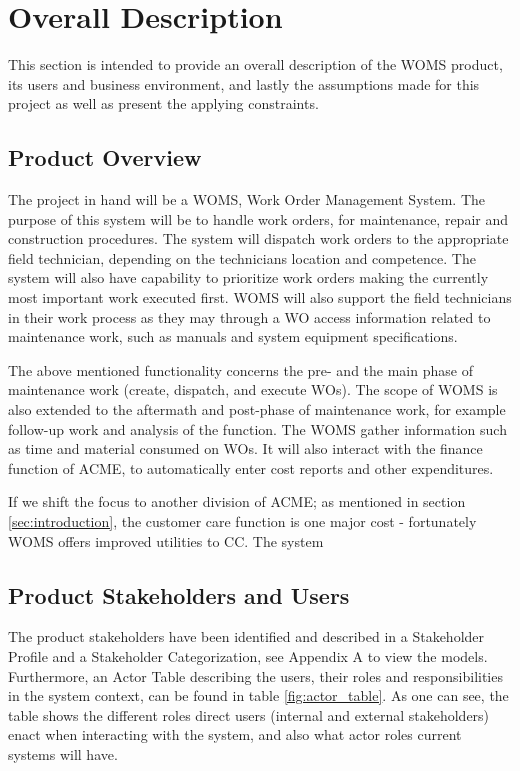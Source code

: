 \section{Overall Description}
\label{sec:overall_description}
This section is intended to provide an overall description of the WOMS product, its users and business environment, and lastly the assumptions made for this project as well as present the applying constraints.
\subsection{Product Overview}
The project in hand will be a WOMS, Work Order Management System.  The purpose of this system will be to handle work orders, for maintenance, repair and construction procedures. The system will dispatch work orders to the appropriate field technician, depending on the technicians location and competence. The system will also have capability to prioritize  work orders  making the currently  most important work executed first. WOMS will also support the field technicians in their work process as they may through a WO access information related to maintenance work, such as manuals and system equipment specifications. 

The above mentioned functionality concerns the pre- and the main phase of maintenance work (create, dispatch, and execute WOs). The scope of WOMS is also extended to the aftermath and post-phase of maintenance work, for example follow-up work and analysis of the function. The WOMS gather information such as time and material consumed on WOs. It will also interact with the finance function of ACME, to automatically enter cost reports and other expenditures. 

If we shift the focus to another division of ACME; as mentioned in section \ref{sec:introduction}, the customer care function is one major cost - fortunately WOMS offers improved utilities to CC. The system 

\subsection{Product Stakeholders and Users}
\label{sec:produt_stakeholders_and_users}
The product stakeholders have been identified and described in a Stakeholder Profile and a Stakeholder Categorization, see Appendix A to view the models. Furthermore, an Actor Table describing the users, their roles and responsibilities in the system context, can be found in table \ref{fig:actor_table}. As one can see, the table shows the different roles direct users (internal and external stakeholders) enact when interacting with the system, and also what actor roles current systems will have. 
